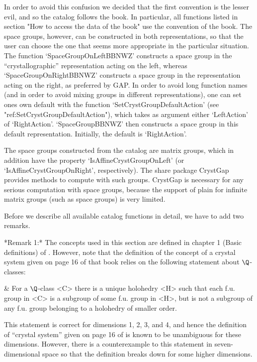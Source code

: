 In order to avoid this confusion we decided that the first convention
is the lesser evil, and so the {\GAP} catalog follows the book. In
particular, all functions listed in section "How to access the data 
of the book" use the convention of the book. The space groups, however,
can be constructed in both representations, so that the user can choose
the one that seems more appropriate in the particular situation.
The function `SpaceGroupOnLeftBBNWZ' constructs a space group in
the ``crystallographic'' representation acting on the left,
whereas `SpaceGroupOnRightBBNWZ' constructs a space group in the
representation acting on the right, as preferred by GAP. In order to 
avoid long function names (and in order to avoid mixing groups in
different representations), one can set one{\pif}s own default 
with the function `SetCrystGroupDefaultAction' 
(see "ref:SetCrystGroupDefaultAction"), 
which takes as argument either `LeftAction' of `RightAction'. 
`SpaceGroupBBNWZ' then constructs a space group in this default
representation. Initially, the default is `RightAction'.

The space groups constructed from the catalog are matrix groups, which
in addition have the property `IsAffineCrystGroupOnLeft' (or
`IsAffineCrystGroupOnRight', respectively). The share package CrystGap
provides methods to compute with such groups. CrystGap is necessary
for any serious computation with space groups, because the support of
plain {\GAP} for infinite matrix groups (such as space groups) is very
limited.

Before we describe all available catalog functions in detail, we have
to add two remarks.

*Remark 1:*
The concepts  used  in  this section are   defined  in chapter 1   (Basic
definitions) of \cite{BBNWZ78}.  However, note that the definition of the
concept of a crystal system given on page  16 of that  book relies on the
following statement about $\Q$-classes:

\beginitems
& For a  $\Q$-class  <C>  there is a unique holohedry <H> such that
  each  f.u. group in <C>  is a subgroup of some  f.u. group in
  <H>,  but is not  a subgroup of any  f.u. group  belonging to a
  holohedry of smaller order.
\enditems

This  statement is correct for  dimensions 1, 2,  3, and 4, and hence the
definition of ``crystal system'' given on page 16 of \cite{BBNWZ78} is
known  to   be unambiguous for   these  dimensions.  However, there  is a
counterexample to  this statement in seven-dimensional  space so that the
definition breaks down for some higher dimensions.

